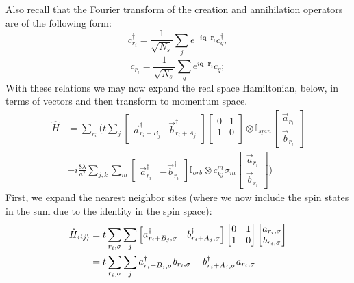 \documentclass[10pt,a4paper]{article}
\begin{document}
\begin{multicols}{2}
Also recall that the Fourier transform of the creation and annihilation operators are of the following form:
$$
c^{\dagger}_{r_i} = \frac{1}{\sqrt{N_s}}\sum_j e^{-i\mathbf{q}\cdot\mathbf{r}_i}c_{q}^{\dagger},
$$
$$
c_{r_i} = \frac{1}{\sqrt{N_s}}\sum_q e^{i\mathbf{q}\cdot\mathbf{r}_i}c_{q};
$$
With these relations we may now expand the real space Hamiltonian, below, in terms of vectors and then transform to momentum space.\small
\begin{align*}
\hat{H} & = \sum_{r_i}\Bigg(t\sum_{j}\begin{bmatrix} \vec{a}_{r_i+B_j}^{\dagger} & \vec{b}_{r_i+A_j}^{\dagger} \end{bmatrix}\begin{bmatrix} 0&1\\1&0\\ \end{bmatrix}\otimes \mathbb{I}_{spin}\begin{bmatrix} \vec{a}_{r_i} \\ \vec{b}_{r_i}\end{bmatrix}\\
 &+i\frac{8\lambda}{a^2}\sum_{j,k}\sum_{m}\begin{bmatrix} \vec{a}_{r_i}^{\dagger} & -\vec{b}_{r_i}^{\dagger} \end{bmatrix}\mathbb{I}_{orb}\otimes c^m_{kj}\sigma_m \begin{bmatrix} \vec{a}_{r_i} \\ \vec{b}_{r_i}\end{bmatrix}\Bigg)
\end{align*}\normalsize
First, we expand the nearest neighbor sites (where we now include the spin states in the sum due to the identity in the spin space):\small
\begin{align*}
{\scriptsize \hat{H}_{\langle ij\rangle}} & = t\sum_{r_i,\sigma}\sum_{j}\begin{bmatrix} a_{r_i+B_j,\sigma}^{\dagger} & b_{r_i+A_j,\sigma}^{\dagger} \end{bmatrix}\begin{bmatrix} 0&1\\1&0\\ \end{bmatrix}\begin{bmatrix} a_{r_i,\sigma} \\ b_{r_i,\sigma}\end{bmatrix}\\
&= t\sum_{r_i,\sigma}\sum_{j} a_{r_i+B_j,\sigma}^{\dagger}b_{r_i,\sigma} + b_{r_i+A_j,\sigma}^{\dagger} a_{r_i,\sigma} \\

\end{align*}
\end{multicols}
\end{document}

